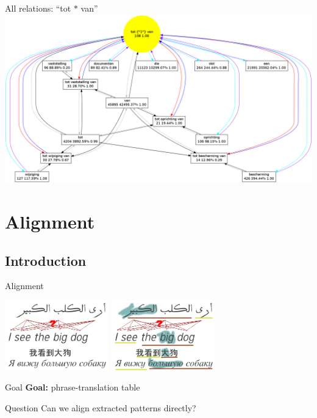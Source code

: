 \documentclass[compress]{beamer}
\begin{document}


\begin{frame}{All relations: ``tot $*$ van''}
 \includegraphics[width=140.0mm]{graph_totvan_all.png}
\end{frame}

\section{Alignment}

\subsection{Introduction}

\begin{frame}{Alignment}

	\begin{center}
	 \includegraphics[width=45.0mm]{align1.png} \includegraphics[width=45.0mm]{align2.png} 
	\end{center}

	\begin{block}{Goal}
		\textbf{Goal:} phrase-translation table
	\end{block}


	\begin{block}{Question}
		Can we align extracted patterns directly?
	\end{block}

\end{frame}
\end{document}
